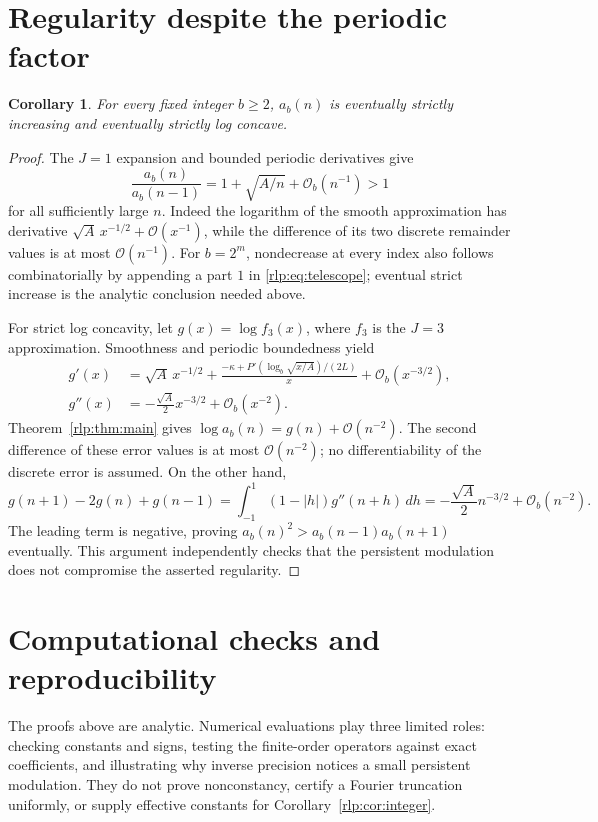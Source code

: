 \documentclass[11pt,letterpaper]{article}
\numberwithin{equation}{section}
\newtheorem{corollary}[theorem]{Corollary}
\theoremstyle{remark}\newtheorem{remark}[theorem]{Remark}
\newcommand{\Ord}{\mathcal O}
\begin{document}
\section{Regularity despite the periodic factor}
\label{rlp:sec:regularity}
\begin{corollary}\label{rlp:cor:regularity}
For every fixed integer $b\ge2$, $a_b(n)$ is eventually strictly increasing and eventually strictly log concave.
\end{corollary}
\begin{proof}
The $J=1$ expansion and bounded periodic derivatives give
\begin{equation}\label{rlp:eq:ratioinc}
 \frac{a_b(n)}{a_b(n-1)}=1+\sqrt{A/n}+\Ord_b(n^{-1})>1
\end{equation}
for all sufficiently large $n$. Indeed the logarithm of the smooth approximation has derivative $\sqrt A\,x^{-1/2}+\Ord(x^{-1})$, while the difference of its two discrete remainder values is at most $\Ord(n^{-1})$. For $b=2^m$, nondecrease at every index also follows combinatorially by appending a part $1$ in \eqref{rlp:eq:telescope}; eventual strict increase is the analytic conclusion needed above.

For strict log concavity, let $g(x)=\log f_3(x)$, where $f_3$ is the $J=3$ approximation. Smoothness and periodic boundedness yield
\begin{align*}
 g'(x)&=\sqrt A\,x^{-1/2}
 +\frac{-\kappa+P'(\log_b\sqrt{x/A})/(2L)}x
 +\Ord_b(x^{-3/2}),\\
 g''(x)&=-\frac{\sqrt A}{2}x^{-3/2}+\Ord_b(x^{-2}).
\end{align*}
Theorem~\ref{rlp:thm:main} gives $\log a_b(n)=g(n)+\Ord(n^{-2})$. The second difference of these error values is at most $\Ord(n^{-2})$; no differentiability of the discrete error is assumed. On the other hand,
\[
 g(n+1)-2g(n)+g(n-1)
 =\int_{-1}^1(1-|h|)g''(n+h)\,dh
 =-\frac{\sqrt A}{2}n^{-3/2}+\Ord_b(n^{-2}).
\]
The leading term is negative, proving
$a_b(n)^2>a_b(n-1)a_b(n+1)$ eventually. This argument independently checks that the persistent modulation does not compromise the asserted regularity.
\end{proof}

\section{Computational checks and reproducibility}
\label{rlp:sec:checks}
The proofs above are analytic. Numerical evaluations play three limited roles: checking constants and signs, testing the finite-order operators against exact coefficients, and illustrating why inverse precision notices a small persistent modulation. They do not prove nonconstancy, certify a Fourier truncation uniformly, or supply effective constants for Corollary~\ref{rlp:cor:integer}.
\end{document}
